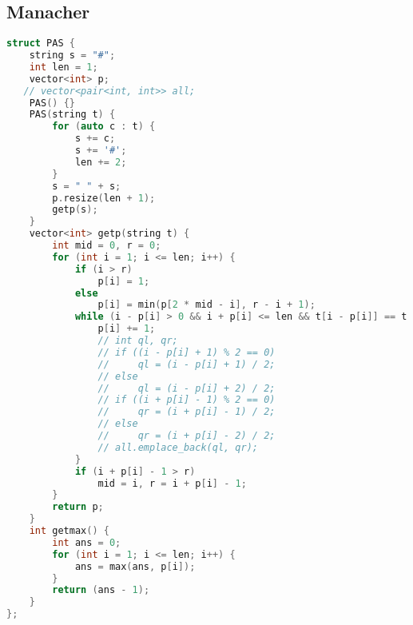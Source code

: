 \subsection{Manacher}
\begin{lstlisting}[language=C++]
struct PAS {
    string s = "#";
    int len = 1;
    vector<int> p;
   // vector<pair<int, int>> all;
    PAS() {}
    PAS(string t) {
        for (auto c : t) {
            s += c;
            s += '#';
            len += 2;
        }
        s = " " + s;
        p.resize(len + 1);
        getp(s);
    }
    vector<int> getp(string t) {
        int mid = 0, r = 0;
        for (int i = 1; i <= len; i++) {
            if (i > r)
                p[i] = 1;
            else
                p[i] = min(p[2 * mid - i], r - i + 1);
            while (i - p[i] > 0 && i + p[i] <= len && t[i - p[i]] == t[i + p[i]]) {
                p[i] += 1;
                // int ql, qr;
                // if ((i - p[i] + 1) % 2 == 0)
                //     ql = (i - p[i] + 1) / 2;
                // else
                //     ql = (i - p[i] + 2) / 2;
                // if ((i + p[i] - 1) % 2 == 0)
                //     qr = (i + p[i] - 1) / 2;
                // else
                //     qr = (i + p[i] - 2) / 2;
                // all.emplace_back(ql, qr);
            }
            if (i + p[i] - 1 > r)
                mid = i, r = i + p[i] - 1;
        }
        return p;
    }
    int getmax() {
        int ans = 0;
        for (int i = 1; i <= len; i++) {
            ans = max(ans, p[i]);
        }
        return (ans - 1);
    }
};
\end{lstlisting}
